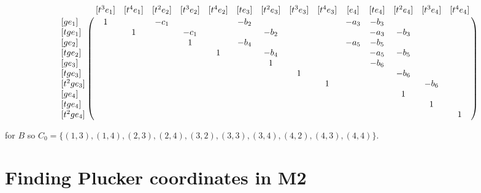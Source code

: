 \documentclass[11pt,draft]{article}
\begin{document}
{
\hspace{-4cm}\begin{minipage}{1.5\textwidth}
\[
\bordermatrix{ & [t^3e_1] & [t^4e_1]  & [t^2e_2] & [t^3e_2] & [t^4 e_2] & [te_3] & [t^2e_3] & [t^3e_3] & [t^4e_3] & [e_4] & [te_4] & [t^2e_4] & [t^3e_4] & [t^4e_4] \cr
[ge_1]         & 1       &  & -c_1     &         & & -b_2   &          &          & & -a_3  & -b_3                                    \cr
[tge_1]        &         & 1  &          & -c_1  &   &        & -b_2     &         & &       & -a_3   & -b_3                           \cr 
[ge_2]         &         &  &          & 1       & & -b_4   &          &          & & -a_5  & -b_5                                    \cr
[tge_2]        &         &  &          &         & 1 &        & -b_4     &          & &      & -a_5  & -b_5                            \cr
[ge_3]         &         &  &          &         & &        &           1 &    &    &   & -b_6                                    \cr
[tge_3]        &         &  &          &         & &        &          &           1 & &  &       & -b_6                            \cr
{[t^2 ge_3] }    &         &  &          &         & &        &          &  & 1             & &       & & -b_6                          \cr
[ge_4]         &         &  &          &         & &        &          &          &      & &       & 1 &                             \cr
[tge_4]        &         &  &          &         & &        &          &          &      & &       &       & 1                       \cr 
[t^2 ge_4]     &         &  &          &         & &        &          &          &      & &       &       &       & 1  
}
\]
    \end{minipage}
}
for $B$ so $C_0 = \{(1,3),(1,4),(2,3),(2,4),(3,2),(3,3),(3,4),(4,2),(4,3),(4,4)\}$. 


\section*{Finding Plucker coordinates in M2}
\end{document}

